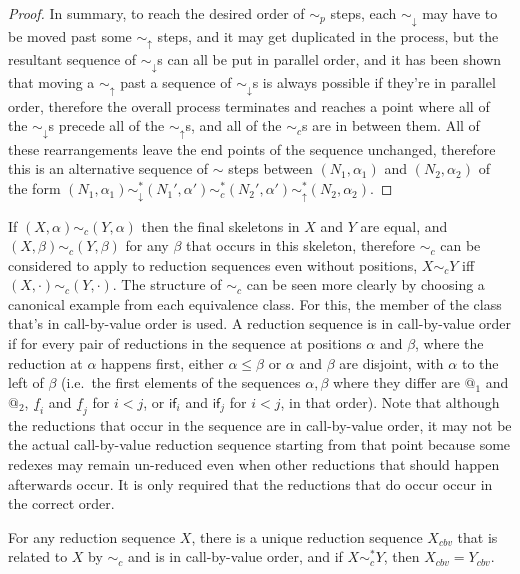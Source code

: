\begin{proof}
  In summary, to reach the desired order of $\sim_p$ steps, each $\sim_\downarrow$ may have to be moved past some $\sim_\uparrow$ steps, and it may get duplicated in the process, but the resultant sequence of $\sim_\downarrow$s can all be put in parallel order, and it has been shown that moving a $\sim_\uparrow$ past a sequence of $\sim_\downarrow$s is always possible if they're in parallel order, therefore the overall process terminates and reaches a point where all of the $\sim_\downarrow$s precede all of the $\sim_\uparrow$s, and all of the $\sim_c$s are in between them. All of these rearrangements leave the end points of the sequence unchanged, therefore this is an alternative sequence of $\sim$ steps between $(N_1,\alpha_1)$ and $(N_2,\alpha_2)$ of the form $(N_1,\alpha_1) \sim_\downarrow^* (N_1', \alpha') \sim_c^* (N_2', \alpha') \sim_\uparrow^* (N_2,\alpha_2)$.
\end{proof}


If $(X,\alpha) \sim_c (Y,\alpha)$ then the final skeletons in $X$ and $Y$ are equal, and $(X,\beta) \sim_c (Y,\beta)$ for any $\beta$ that occurs in this skeleton, therefore $\sim_c$ can be considered to apply to reduction sequences even without positions, $X \sim_c Y$ iff $(X,\cdot) \sim_c (Y,\cdot)$. The structure of $\sim_c$ can be seen more clearly by choosing a canonical example from each equivalence class. For this, the member of the class that's in call-by-value order is used. A reduction sequence is in call-by-value order if for every pair of reductions in the sequence at positions $\alpha$ and $\beta$, where the reduction at $\alpha$ happens first, either $\alpha \leq \beta$ or $\alpha$ and $\beta$ are disjoint, with $\alpha$ to the left of $\beta$ (i.e.~the first elements of the sequences $\alpha, \beta$ where they differ are $@_1$ and $@_2$, $\underline f_i$ and $\underline f_j$ for $i < j$, or $\textsf{if}_i$ and $\textsf{if}_j$ for $i < j$, in that order). Note that although the reductions that occur in the sequence are in call-by-value order, it may not be the actual call-by-value reduction sequence starting from that point because some redexes may remain un-reduced even when other reductions that should happen afterwards occur. It is only required that the reductions that do occur occur in the correct order.

\begin{lemma} \label{canonicalCousins}
For any reduction sequence $X$, there is a unique reduction sequence $X_{cbv}$ that is related to $X$ by $\sim_c$ and is in call-by-value order, and if $X \sim_c^* Y$, then $X_{cbv} = Y_{cbv}$.
\end{lemma}

